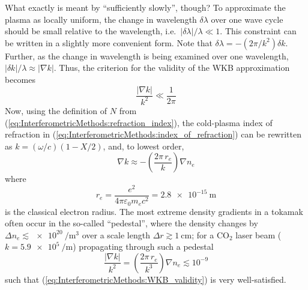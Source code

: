 What exactly is meant by ``sufficiently slowly'', though?
To approximate the plasma as locally uniform,
the change in wavelength $\delta \lambda$ over one wave cycle
should be small relative to the wavelength,
i.e.\ $|\delta \lambda| / \lambda \ll 1$.
This constraint can be written in a slightly more convenient form.
Note that $\delta \lambda = - (2 \pi / k^2) \delta k $.
Further, as the change in wavelength is being examined over one wavelength,
$|\delta k| / \lambda \approx |\nabla k|$.
Thus, the criterion for the validity of the WKB approximation becomes
\begin{equation}
  \frac{|\nabla k|}{k^2} \ll \frac{1}{2 \pi}
  \label{eq:InterferometricMethods:WKB_validity}
\end{equation}
Now, using the definition of $N$ from
(\ref{eq:InterferometricMethods:refraction_index}),
the cold-plasma index of refraction in
(\ref{eq:InterferometricMethods:index_of_refraction})
can be rewritten as $k = (\omega / c) (1 - X / 2)$, and, to lowest order,
\begin{equation}
  \nabla k
  \approx
  -\left( \frac{2 \pi \, r_e}{k} \right) \nabla n_e
\end{equation}
where
\begin{equation}
  r_e
  =
  \frac{e^2}{4 \pi \varepsilon_0 m_e c^2}
  =
  \SI{2.8e-15}{\meter}
  \label{eq:InterferometricMethods:classical_electron_radius}
\end{equation}
is the classical electron radius.
The most extreme density gradients in a tokamak
often occur in the so-called ``pedestal'',
where the density changes by
$\Delta n_e \lesssim \SI{e20}{\per\meter\cubed}$
over a scale length $\Delta r \gtrsim \SI{1}{\centi\meter}$;
for a CO$_2$ laser beam ($k = \SI{5.9e5}{\per\meter}$)
propagating through such a pedestal
\begin{equation}
  \frac{|\nabla k|}{k^2}
  =
  \left( \frac{2 \pi \, r_e}{k^3} \right) \nabla n_e
  \lesssim
  10^{-9}
\end{equation}
such that (\ref{eq:InterferometricMethods:WKB_validity})
is very well-satisfied.


